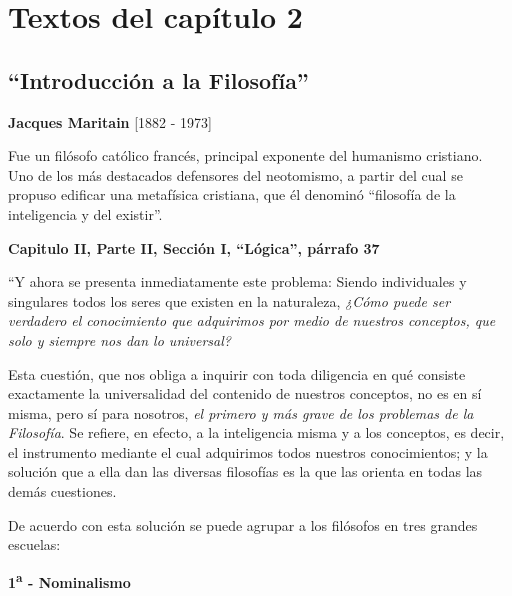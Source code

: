 \documentclass{article}
\begin{document}
\section{Textos del capítulo 2}
    
\subsection{``Introducción a la Filosofía''}
    
\begin{center}
    \large{\textbf{Jacques Maritain} [1882 - 1973]} 
\end{center}
    Fue un filósofo católico francés, principal exponente del humanismo cristiano. Uno de los más destacados defensores del neotomismo, a partir del cual se propuso edificar una metafísica cristiana, que él denominó ``filosofía de la inteligencia y del existir''. \par

\begin{center}
    \large{\textbf{Capitulo II, Parte II, Sección I, ``Lógica'', párrafo 37}}
\end{center}
    
    ``Y ahora se presenta inmediatamente este problema: Siendo individuales y singulares todos los seres que existen en la naturaleza, \emph{¿Cómo puede ser verdadero el conocimiento que adquirimos por medio de nuestros conceptos, que solo y siempre nos dan lo universal?} \par
    
    Esta cuestión, que nos obliga a inquirir con toda diligencia en qué consiste exactamente la universalidad del contenido de nuestros conceptos, no es en sí misma, pero sí para nosotros, \emph{el primero y más grave de los problemas de la Filosofía}. Se refiere, en efecto, a la inteligencia misma y a los conceptos, es decir, el instrumento mediante el cual adquirimos todos nuestros conocimientos; y la solución que a ella dan las diversas filosofías es la que las orienta en todas las demás cuestiones. \par
    
    De acuerdo con esta solución se puede agrupar a los filósofos en tres grandes escuelas: \par

\begin{center}
    \textbf{1\textsuperscript{a} - Nominalismo}
\end{center}
\end{document}
